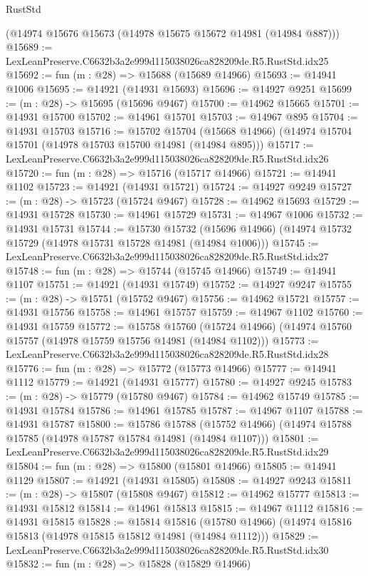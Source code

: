 \begin{lexlean}{RustStd}
\begin{coremodule}
    (@14974 @15676 @15673 (@14978 @15675 @15672 @14981 (@14984 @887)))
@15689 := LexLeanPreserve.C6632b3a2e999d115038026ca828209de.R5.RustStd.idx25
@15692 := fun (m : @28) => @15688 (@15689 @14966)
@15693 := @14941 @1006
@15695 := @14921 (@14931 @15693)
@15696 := @14927 @9251
@15699 := (m : @28) -> @15695 (@15696 @9467)
@15700 := @14962 @15665
@15701 := @14931 @15700
@15702 := @14961 @15701
@15703 := @14967 @895
@15704 := @14931 @15703
@15716 := @15702
    @15704
    (@15668 @14966)
    (@14974 @15704 @15701 (@14978 @15703 @15700 @14981 (@14984 @895)))
@15717 := LexLeanPreserve.C6632b3a2e999d115038026ca828209de.R5.RustStd.idx26
@15720 := fun (m : @28) => @15716 (@15717 @14966)
@15721 := @14941 @1102
@15723 := @14921 (@14931 @15721)
@15724 := @14927 @9249
@15727 := (m : @28) -> @15723 (@15724 @9467)
@15728 := @14962 @15693
@15729 := @14931 @15728
@15730 := @14961 @15729
@15731 := @14967 @1006
@15732 := @14931 @15731
@15744 := @15730
    @15732
    (@15696 @14966)
    (@14974 @15732 @15729 (@14978 @15731 @15728 @14981 (@14984 @1006)))
@15745 := LexLeanPreserve.C6632b3a2e999d115038026ca828209de.R5.RustStd.idx27
@15748 := fun (m : @28) => @15744 (@15745 @14966)
@15749 := @14941 @1107
@15751 := @14921 (@14931 @15749)
@15752 := @14927 @9247
@15755 := (m : @28) -> @15751 (@15752 @9467)
@15756 := @14962 @15721
@15757 := @14931 @15756
@15758 := @14961 @15757
@15759 := @14967 @1102
@15760 := @14931 @15759
@15772 := @15758
    @15760
    (@15724 @14966)
    (@14974 @15760 @15757 (@14978 @15759 @15756 @14981 (@14984 @1102)))
@15773 := LexLeanPreserve.C6632b3a2e999d115038026ca828209de.R5.RustStd.idx28
@15776 := fun (m : @28) => @15772 (@15773 @14966)
@15777 := @14941 @1112
@15779 := @14921 (@14931 @15777)
@15780 := @14927 @9245
@15783 := (m : @28) -> @15779 (@15780 @9467)
@15784 := @14962 @15749
@15785 := @14931 @15784
@15786 := @14961 @15785
@15787 := @14967 @1107
@15788 := @14931 @15787
@15800 := @15786
    @15788
    (@15752 @14966)
    (@14974 @15788 @15785 (@14978 @15787 @15784 @14981 (@14984 @1107)))
@15801 := LexLeanPreserve.C6632b3a2e999d115038026ca828209de.R5.RustStd.idx29
@15804 := fun (m : @28) => @15800 (@15801 @14966)
@15805 := @14941 @1129
@15807 := @14921 (@14931 @15805)
@15808 := @14927 @9243
@15811 := (m : @28) -> @15807 (@15808 @9467)
@15812 := @14962 @15777
@15813 := @14931 @15812
@15814 := @14961 @15813
@15815 := @14967 @1112
@15816 := @14931 @15815
@15828 := @15814
    @15816
    (@15780 @14966)
    (@14974 @15816 @15813 (@14978 @15815 @15812 @14981 (@14984 @1112)))
@15829 := LexLeanPreserve.C6632b3a2e999d115038026ca828209de.R5.RustStd.idx30
@15832 := fun (m : @28) => @15828 (@15829 @14966)

\end{coremodule}
\end{lexlean}

